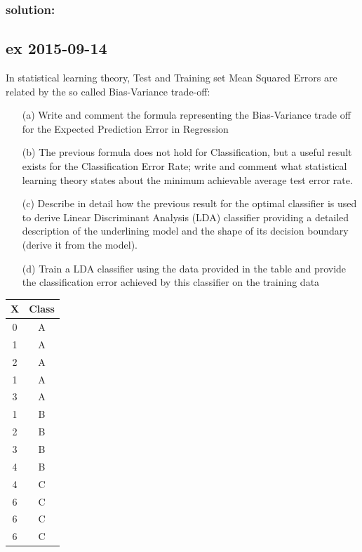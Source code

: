 \documentclass[a4paper,12pt,titlepage]{article} %
\begin{document}
\subsubsection{solution:}


\newpage
\subsection{ex 2015-09-14}
In statistical learning theory, Test and Training set Mean Squared Errors are related by the so called Bias-Variance trade-off:
\begin{itemize}
\item[(a)] Write and comment the formula representing the Bias-Variance trade off for the Expected Prediction Error in Regression
\item[(b)] The previous formula does not hold for Classification, but a useful result exists for the Classification Error Rate; write and comment what statistical learning theory states about the minimum achievable average test error rate.
\item[(c)] Describe in detail how the previous result for the optimal classifier is used to derive Linear Discriminant Analysis (LDA) classifier providing a detailed description of the underlining model and the shape of its decision boundary (derive it from the model).
\item[(d)] Train a LDA classifier using the data provided in the table and provide the classification error achieved by this classifier on the training data
\end{itemize}

\begin{center}
  \begin{tabular}{c|c}
    X & Class \\
    \hline
    \hline
    0 & A \\
    1 & A \\
    2 & A \\
    1 & A \\
    3 & A \\
    \hline
    1 & B \\
    2 & B \\
    3 & B \\
    4 & B \\
    \hline
    4 & C \\
    6 & C \\
    6 & C \\
    6 & C \\
    \hline
  \end{tabular}
\end{center}
\end{document}
